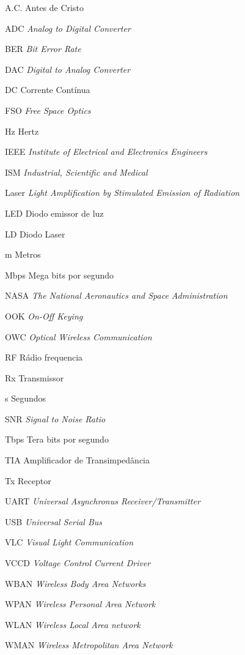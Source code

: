 \begin{siglas}


\item [A.C.]		Antes de Cristo
\item [ADC] 		\textit{Analog to Digital Converter}
\item [BER] 		\textit{Bit Error Rate}
\item [DAC] 		\textit{Digital to Analog Converter}
\item [DC]		Corrente Contínua
\item [FSO]		\textit{Free Space Optics}
\item [Hz] 		Hertz
\item [IEEE] 	\textit{Institute of Electrical and Electronics Engineers}
\item [ISM]		\textit{Industrial, Scientific and Medical}
\item [Laser] 	\textit{Light Amplification by Stimulated Emission of Radiation}
\item [LED] 		Diodo emissor de luz
\item [LD] 		Diodo Laser
\item [m] 		Metros
\item [Mbps]	 	Mega bits por segundo
\item [NASA]		\textit{The National Aeronautics and Space Administration}
\item [OOK] 		\textit{On-Off Keying}
\item [OWC] 		\textit{Optical Wireless Communication}
\item [RF] 		Rádio frequencia
\item [Rx]		Transmissor
\item [s] 		Segundos
\item [SNR] 		\textit{Signal to Noise Ratio}
\item [Tbps]		Tera bits por segundo
\item [TIA]		Amplificador de Transimpedância
\item [Tx]		Receptor
\item [UART] 	\textit{Universal Asynchronus Receiver/Transmitter}
\item [USB] 		\textit{Universal Serial Bus}
\item [VLC] 		\textit{Visual Light Communication}
\item [VCCD]		\textit{Voltage Control Current Driver}
\item [WBAN]		\textit{Wireless Body Area Networks}
\item [WPAN]		\textit{Wireless Personal Area Network}
\item [WLAN]		\textit{Wireless Local Area network}
\item [WMAN]		\textit{Wireless Metropolitan Area Network}








 
\end{siglas}

